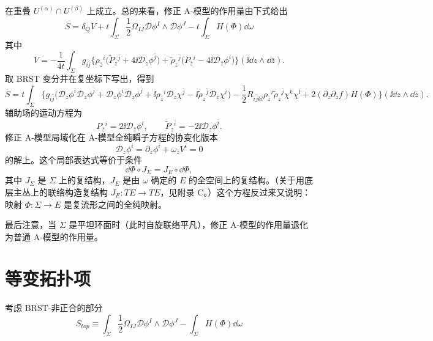 在重叠 $U^{(\alpha)}\cap U^{(\beta)}$ 上成立。总的来看，修正 A-模型的作用量由下式给出
\begin{equation}
S=\delta_QV+t\int_\Sigma\frac12\Omega_{IJ}\mathcal{D}\phi^I\wedge\mathcal{D}\phi^J-t\int_\Sigma H(\Phi)\dd\omega \tag{7.7}
\end{equation}
其中
\begin{equation}
V=-\frac{1}{4t}\int_\Sigma g_{i\bar j}\Big\{\rho_{\bar z}{}^i\big(\tilde P_z{}^{\bar j}+4\ii\mathcal{D}_z\phi^{\bar j}\big)+\tilde\rho_z{}^{\bar j}\big(P_{\bar z}{}^i-4\ii\mathcal{D}_{\bar z}\phi^i\big)\Big\}(\ii\dd z\wedge\dd\bar z). \tag{7.8}
\end{equation}
取 BRST 变分并在复坐标下写出，得到
\[
S=t\int_\Sigma\Big\{g_{i\bar j}\big(\mathcal{D}_z\phi^i\mathcal{D}_{\bar z}\phi^{\bar j}+\mathcal{D}_{\bar z}\phi^i\mathcal{D}_z\phi^{\bar j}+\ii\rho_{\bar z}{}^i\mathcal{D}_z\chi^{\bar j}-\ii\tilde\rho_z{}^{\bar j}\mathcal{D}_{\bar z}\chi^i\big)-\frac12R_{i\bar jk\bar l}\rho_{\bar z}{}^i\tilde\rho_z{}^{\bar j}\chi^k\chi^{\bar l}+2(\partial_z\partial_{\bar z}f)H(\Phi)\Big\}(\ii\dd z\wedge\dd\bar z).
\]
辅助场的运动方程为
\[
P_{\bar z}{}^i=2\ii\mathcal{D}_{\bar z}\phi^i,\qquad \tilde P_z{}^{\bar i}=-2\ii\mathcal{D}_z\phi^{\bar i}.
\]
修正 A-模型局域化在 A-模型全纯瞬子方程的协变化版本
\[
\mathcal{D}_{\bar z}\phi^i=\partial_{\bar z}\phi^i+\omega_{\bar z}V^i=0
\]
的解上。这个局部表达式等价于条件
\[
\dd\Phi\circ J_\Sigma=J_E\circ\dd\Phi,
\]
其中 $J_\Sigma$ 是 $\Sigma$ 上的复结构，$J_E$ 是由 $\omega$ 确定的 $E$ 的全空间上的复结构。（关于用底层主丛上的联络构造复结构 $J_E:TE\to TE$，见附录 C。）这个方程反过来又说明：映射 $\Phi:\Sigma\to E$ 是复流形之间的全纯映射。

最后注意，当 $\Sigma$ 是平坦环面时（此时自旋联络平凡），修正 A-模型的作用量退化为普通 A-模型的作用量。


\section{等变拓扑项}

考虑 BRST-非正合的部分
\[
S_{top}\equiv\int_\Sigma\frac12\Omega_{IJ}\mathcal{D}\phi^I\wedge\mathcal{D}\phi^J-\int_\Sigma H(\Phi)\dd\omega
\]
